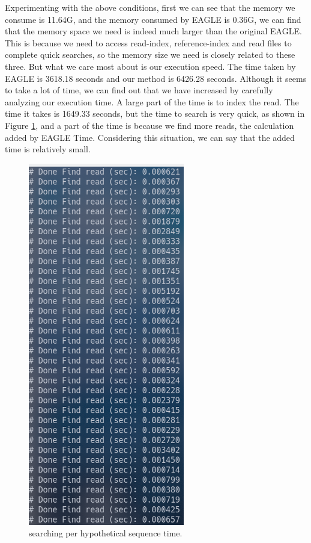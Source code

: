 Experimenting with the above conditions, first we can see that the memory we consume is 11.64G, and the memory consumed by EAGLE is 0.36G, we can find that the memory space we need is indeed much larger than the original EAGLE. This is because we need to access read-index, reference-index and read files to complete quick searches, so the memory size we need is closely related to these three.
But what we care most about is our execution speed. The time taken by EAGLE is 3618.18 seconds and our method is 6426.28 seconds. Although it seems to take a lot of time, we can find out that we have increased by carefully analyzing our execution time. A large part of the time is to index the read. The time it takes is 1649.33 seconds, but the time to search is very quick, as shown in Figure \ref{search_time}, and a part of the time is because we find more reads, the calculation added by EAGLE Time. Considering this situation, we can say that the added time is relatively small.

\begin{figure}[H]
\centering
\includegraphics[width=0.4\columnwidth]{body/image/search_time.png}
\caption[searching time]{searching per hypothetical sequence time.}
\label{search_time}
\end{figure}
